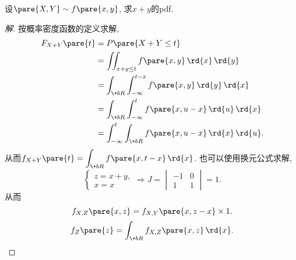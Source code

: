 \documentclass{ctexart}
\begin{document}
\begin{sample}
    \begin{ex}
        设$\pare{X,Y}\sim f\pare{x,y}$, 求$x+y$的pdf.
    \end{ex}
    \begin{proof}[解]
        按概率密度函数的定义求解,
        \begin{align*}
            F_{X+Y}\pare{t} &= P\pare{X+Y\le t} \\
            &= \iint_{x+y\le t} f\pare{x,y}\,\rd{x}\,\rd{y} \\
            &= \int_{\+bR} \int_{-\infty}^{t-x} f\pare{x,y}\,\rd{y}\,\rd{x} \\
            &= \int_{\+bR} \int_{-\infty}^t f\pare{x,u-x}\,\rd{u}\,\rd{x} \\
            &= \int_{-\infty}^t \int_{\+bR} f\pare{x,u-x}\,\rd{x}\,\rd{u}.
        \end{align*}
        从而$f_{X+Y}\pare{t} = \displaystyle \int_{\+bR} f\pare{x,t-x}\,\rd{x}$. 也可以使用换元公式求解,
        \[ \begin{cases}
            z = x+y,\\
            x=x
        \end{cases}\Rightarrow J = \begin{vmatrix}
            -1 & 0 \\
            1 & 1
        \end{vmatrix} = 1. \]
        从而
        \[ f_{X,Z}\pare{x,z} = f_{X,Y}\pare{x,z-x} \times 1. \]
        \[ f_Z\pare{z} = \int_{\+bR} f_{X,Z}\pare{x,z}\,\rd{x}. \qedhere \]
    \end{proof}
\end{sample}
\end{document}
